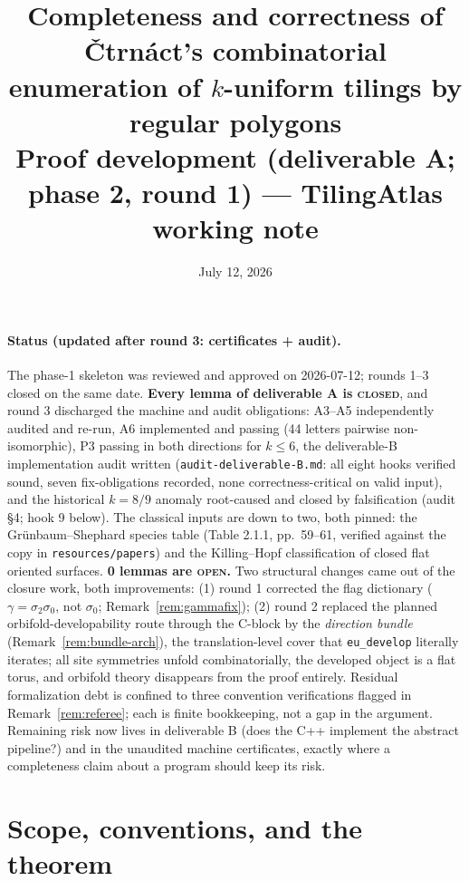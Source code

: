\documentclass[11pt]{article}
\title{Completeness and correctness of \v{C}trn\'act's combinatorial enumeration
of $k$-uniform tilings by regular polygons\\
\large Proof development (deliverable A; phase 2, round 1) --- TilingAtlas working note}
\author{}
\date{July 12, 2026}
\theoremstyle{definition}
\begin{document}
\maketitle

\paragraph{Status (updated after round 3: certificates + audit).}
The phase-1 skeleton was reviewed and approved on 2026-07-12; rounds 1--3 closed on the
same date. \textbf{Every lemma of deliverable A is \textsc{closed}}, and round 3
discharged the machine and audit obligations: A3--A5 independently audited and re-run,
A6 implemented and passing (44 letters pairwise non-isomorphic), P3 passing in both
directions for $k \le 6$, the deliverable-B implementation audit written
(\texttt{audit-deliverable-B.md}: all eight hooks verified sound, seven fix-obligations
recorded, none correctness-critical on valid input), and the historical $k=8/9$ anomaly
root-caused and closed by falsification (audit \S4; hook 9 below). The classical inputs are down to two, both pinned: the
Gr\"unbaum--Shephard species table (Table 2.1.1, pp.~59--61, verified against the copy
in \texttt{resources/papers}) and the Killing--Hopf classification of closed flat
oriented surfaces. \textbf{0 lemmas are \textsc{open}.} Two structural changes came out
of the closure work, both improvements: (1) round 1 corrected the flag dictionary
($\gamma = \sigma_2\sigma_0$, not $\sigma_0$; Remark~\ref{rem:gammafix}); (2) round 2
replaced the planned orbifold-developability route through the C-block by the
\emph{direction bundle} (Remark~\ref{rem:bundle-arch}), the translation-level cover that
\texttt{eu\_develop} literally iterates; all site symmetries unfold combinatorially, the
developed object is a flat torus, and orbifold theory disappears from the proof
entirely. Residual formalization debt is confined to three convention verifications
flagged in Remark~\ref{rem:referee}; each is finite bookkeeping, not a gap in the
argument. Remaining risk now lives in deliverable B (does the C++ implement the abstract
pipeline?) and in the unaudited machine certificates, exactly where a completeness claim
about a program should keep its risk.

\tableofcontents

\section{Scope, conventions, and the theorem}\label{sec:scope}
\end{document}
